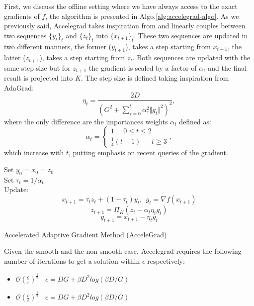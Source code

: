 \documentclass[12pt]{article}
\theoremstyle{definition}
\begin{document}
First, we discuss the offline setting where we have always access to the exact gradients of $f$, the algorithm is presented in Algo.\ref{alg:accelegrad-algo}. As we previously said, Accelegrad takes inspiration from \cite{linearcup} and linearly couples between two sequences $\{y_t\}_t$ and $\{z_t\}_t$ into $\{x_{t+1}\}_t$. These two sequences are updated in two different manners, the former ($y_{t+1}$), takes a step starting from $x_{t+1}$, the latter ($z_{t+1}$), takes a step starting from $z_t$. Both sequences are updated with the same step size but for $z_{t+1}$ the gradient is scaled by a factor of $\alpha_t$ and the final result is projected into $K$. The step size is defined taking inspiration from AdaGrad:
\begin{equation}
  \eta_t = \frac{2D}{(G^2 + \sum_{\tau = 0}^t \alpha_{\tau}^2 \Vert g_t \Vert^2)^2},
\label{learning-1}
\end{equation}
where the only difference are the importances weights $\alpha_t$ defined as:
\begin{equation}
  \alpha_t = \begin{cases}
				1 \ \ \ \ \ \ 0 \leq t \leq 2\\
				\frac{1}{4}(t+1) \ \ \ \ \ \ \ t \geqslant 3
			 \end{cases},
\label{alpha}
\end{equation}
which increase with $t$, putting emphasis on recent queries of the gradient. 



\begin{algorithm}

    Set $y_0 = x_0 = z_0$ \\
      {
      	Set $\tau_t = 1/\alpha_t$ \\
      	Update:
			$$ x_{t+1} = \tau_t z_t + (1-\tau_t) y_t, \ \ g_t = \nabla f(x_{t+1}) $$
			$$ z_{t+1} = \Pi_K (z_t - \alpha_t \eta_t g_t) $$
			$$ y_{t+1} = x_{t+1} - \eta_t g_t $$
      }
    \caption{Accelerated Adaptive Gradient Method (AcceleGrad)}
    \label{alg:accelegrad-algo}
\end{algorithm}

\newpage

Given the smooth and the non-smooth case, Accelegrad requires the following number of iterations to get a solution within $\epsilon$ respectively:
\begin{itemize}
  \item $\mathcal{O}(\frac{c}{\epsilon})^{\frac{1}{2}} \ \ \ \ c = DG + \beta D^2log(\beta D/G)$
  \item $\mathcal{O}(\frac{c}{\epsilon})^{\frac{1}{2}} \ \ \ \ c = DG + \beta D^2log(\beta D/G)$
\end{itemize}
\end{document}
